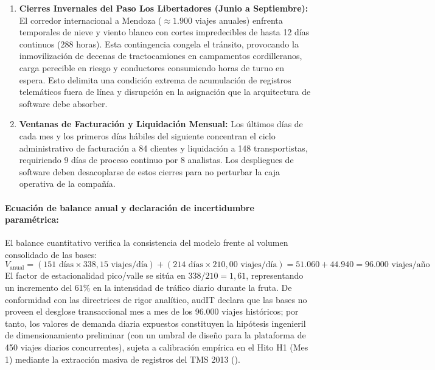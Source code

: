 \begin{enumerate}
\begin{itemize}
    \item \textit{Ventana de intervención técnica (Mayo a Agosto):} Constituye la ventana natural para el mantenimiento mayor y despliegues técnicos escalonados unidad por unidad en terminales, sujeta a condiciones climáticas invernales.
  \end{itemize}
  \item \textbf{Cierres Invernales del Paso Los Libertadores (Junio a Septiembre):} El corredor internacional a Mendoza ($\approx 1.900$ viajes anuales) enfrenta temporales de nieve y viento blanco con cortes impredecibles de hasta 12 días continuos (288 horas). Esta contingencia congela el tránsito, provocando la inmovilización de decenas de tractocamiones en campamentos cordilleranos, carga perecible en riesgo y conductores consumiendo horas de turno en espera. Esto delimita una condición extrema de acumulación de registros telemáticos fuera de línea y disrupción en la asignación que la arquitectura de software debe absorber.
  \item \textbf{Ventanas de Facturación y Liquidación Mensual:} Los últimos días de cada mes y los primeros días hábiles del siguiente concentran el ciclo administrativo de facturación a 84 clientes y liquidación a 148 transportistas, requiriendo 9 días de proceso continuo por 8 analistas. Los despliegues de software deben desacoplarse de estos cierres para no perturbar la caja operativa de la compañía.
\end{enumerate}

\paragraph{Ecuación de balance anual y declaración de incertidumbre paramétrica:}
El balance cuantitativo verifica la consistencia del modelo frente al volumen consolidado de las bases:
\begin{equation}
  V_{\text{anual}} = (151\text{ días} \times 338{,}15\text{ viajes/día}) + (214\text{ días} \times 210{,}00\text{ viajes/día}) = 51.060 + 44.940 = 96.000\text{ viajes/año}
\end{equation}
El factor de estacionalidad pico/valle se sitúa en $338 / 210 = 1{,}61$, representando un incremento del $61\%$ en la intensidad de tráfico diario durante la fruta. De conformidad con las directrices de rigor analítico, audIT declara que las bases no proveen el desglose transaccional mes a mes de los 96.000 viajes históricos; por tanto, los valores de demanda diaria expuestos constituyen la hipótesis ingenieril de dimensionamiento preliminar (con un umbral de diseño para la plataforma de 450 viajes diarios concurrentes), sujeta a calibración empírica en el Hito H1 (Mes 1) mediante la extracción masiva de registros del TMS 2013 ().


